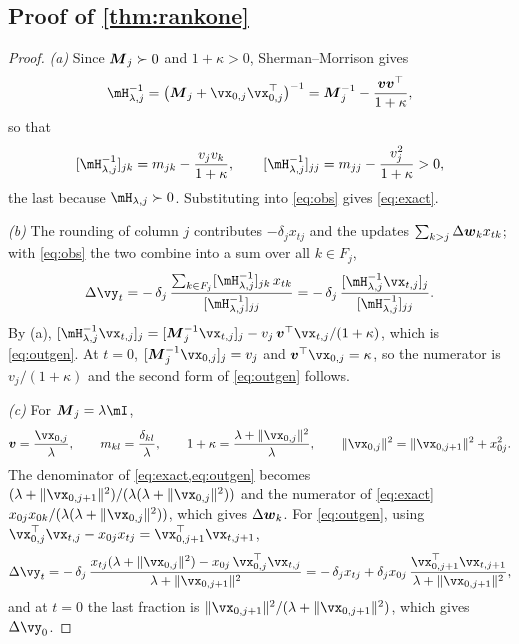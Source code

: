 \subsection{Proof of \texorpdfstring{\cref{thm:rankone}}{Theorem 1}}
\label{app:proofs:thm}
\begin{proof}
\emph{(a)} Since $\boldsymbol{M}_j\succ0$ and $1+\kappa>0$, Sherman--Morrison gives
\[
\hess_{\lambda,j}^{-1}=\big(\mM_j+\vx_{0,j}\vx_{0,j}^\top\big)^{-1}=\mM_j^{-1}-\frac{\vv\vv^\top}{1+\kappa},
\]
so that
\[
[\hess_{\lambda,j}^{-1}]_{jk}=m_{jk}-\frac{v_jv_k}{1+\kappa},\qquad
[\hess_{\lambda,j}^{-1}]_{jj}=m_{jj}-\frac{v_j^2}{1+\kappa}>0,
\]
the last because $\hess_{\lambda,j}\succ0$.
Substituting into \cref{eq:obs} gives \cref{eq:exact}.

\emph{(b)} The rounding of column $j$ contributes $-\delta_jx_{tj}$ and the updates $\sum_{k>j}\Delta\boldsymbol{w}_kx_{tk}$; with \cref{eq:obs} the two combine into a sum over all $k\in F_j$,
\[
\Delta\vy_t=-\,\delta_j\,\frac{\sum_{k\in F_j}[\hess_{\lambda,j}^{-1}]_{jk}\,x_{tk}}{[\hess_{\lambda,j}^{-1}]_{jj}}
=-\,\delta_j\,\frac{[\hess_{\lambda,j}^{-1}\vx_{t,j}]_j}{[\hess_{\lambda,j}^{-1}]_{jj}} .
\]
By (a), $[\hess_{\lambda,j}^{-1}\vx_{t,j}]_j=[\mM_j^{-1}\vx_{t,j}]_j-v_j\,\vv^\top\vx_{t,j}/(1+\kappa)$, which is \cref{eq:outgen}.
At $t=0$, $[\mM_j^{-1}\vx_{0,j}]_j=v_j$ and $\vv^\top\vx_{0,j}=\kappa$, so the numerator is $v_j/(1+\kappa)$ and the second form of \cref{eq:outgen} follows.

\emph{(c)} For $\mM_j=\lambda\mI$,
\[
\vv=\frac{\vx_{0,j}}{\lambda},\qquad
m_{kl}=\frac{\delta_{kl}}{\lambda},\qquad
1+\kappa=\frac{\lambda+\|\vx_{0,j}\|^2}{\lambda},\qquad
\|\vx_{0,j}\|^2=\|\vx_{0,j+1}\|^2+x_{0j}^2 .
\]
The denominator of \cref{eq:exact,eq:outgen} becomes $(\lambda+\|\vx_{0,j+1}\|^2)/(\lambda(\lambda+\|\vx_{0,j}\|^2))$ and the numerator of \cref{eq:exact} $x_{0j}x_{0k}/(\lambda(\lambda+\|\vx_{0,j}\|^2))$, which gives $\Delta\boldsymbol{w}_k$.
For \cref{eq:outgen}, using $\vx_{0,j}^\top\vx_{t,j}-x_{0j}x_{tj}=\vx_{0,j+1}^\top\vx_{t,j+1}$,
\[
\Delta\vy_t=-\,\delta_j\,\frac{x_{tj}(\lambda+\|\vx_{0,j}\|^2)-x_{0j}\,\vx_{0,j}^\top\vx_{t,j}}{\lambda+\|\vx_{0,j+1}\|^2}
=-\,\delta_jx_{tj}+\delta_jx_{0j}\,\frac{\vx_{0,j+1}^\top\vx_{t,j+1}}{\lambda+\|\vx_{0,j+1}\|^2},
\]
and at $t=0$ the last fraction is $\|\vx_{0,j+1}\|^2/(\lambda+\|\vx_{0,j+1}\|^2)$, which gives $\Delta\vy_0$.
\end{proof}


